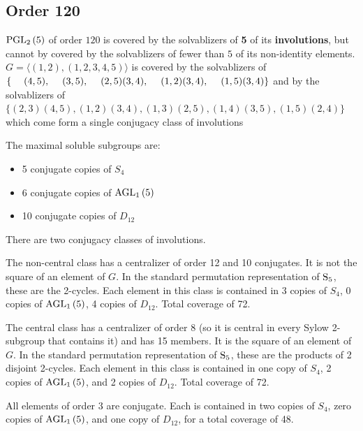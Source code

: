 \documentclass[12pt]{amsart}
\begin{document}
\subsection{Order 120}

$\operatorname{PGL}_{2}\left(5\right)$ of order $120$ is covered by the solvablizers of \textbf{5} of its
\textbf{involutions}, but cannot by covered by the solvablizers of fewer
than $5$ of its non-identity elements. \\
{\tiny $G=\langle(1,2),(1,2,3,4,5)\rangle$ is covered by the solvablizers of $\{ \\
\phantom. \quad (4,5), \\
\phantom. \quad (3,5), \\
\phantom. \quad (2,5)(3,4), \\
\phantom. \quad (1,2)(3,4), \\
\phantom. \quad (1,5)(3,4) \\
\}$ and by the solvablizers of $\{
(2,3)(4,5), (1,2)(3,4), (1,3)(2,5), (1,4)(3,5), (1,5)(2,4)
\}$ which come form a single conjugacy class of involutions}

The maximal soluble subgroups are: \begin{itemize}
\item 5 conjugate copies of $S_4$
\item 6 conjugate copies of $\operatorname{AGL}_{1}\left(5\right)$
\item 10 conjugate copies of $D_{12}$
\end{itemize}

There are two conjugacy classes of involutions.

The non-central class has a centralizer of order 12 and 10 conjugates. It
is not the square of an element of $G$. In the standard permutation
representation of $\operatorname{S}_{5}$, these are the 2-cycles. Each element in
this class is contained in 3 copies of $S_4$, 0 copies of $\operatorname{AGL}_{1}\left(5\right)$,
4 copies of $D_{12}$. Total coverage of 72.

The central class has a centralizer of order 8 (so it is central in every
Sylow 2-subgroup that contains it) and has 15 members. It is the square of
an element of $G$.  In the standard permutation representation of $\operatorname{S}_{5}$,
these are the products of 2 disjoint 2-cycles.  Each element in this class
is contained in one copy of $S_4$, 2 copies of $\operatorname{AGL}_{1}\left(5\right)$, and 2 copies
of $D_{12}$. Total coverage of 72.

All elements of order 3 are conjugate. Each is contained in two copies
of $S_4$, zero copies of $\operatorname{AGL}_{1}\left(5\right)$, and one copy of $D_{12}$, for a
total coverage of 48.
\end{document}
